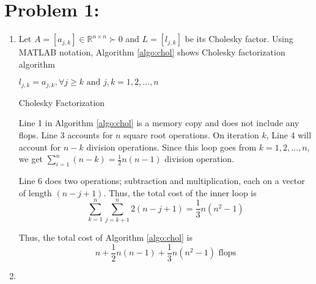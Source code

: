 \section*{Problem 1:}
\begin{enumerate}
\item Let $A = [a_{j,k}] \in \mathbb{R}^{n\times n} \succ 0$ and $L = [l_{j,k}]$ be its Cholesky factor. Using MATLAB notation, Algorithm \ref{algo:chol} shows Cholesky factorization algorithm

\begin{algorithm}[H]
\SetAlgoLined
{}
 $l_{j,k} = a_{j,k}, \forall j\geq k \text{\ and\ }  j,k= 1,2, \ldots, n$ \\
 \caption{Cholesky Factorization}
\label{algo:chol}
\end{algorithm}

\noindent Line 1 in Algorithm \ref{algo:chol} is a memory copy and does not include any flops. Line 3 accounts for $n$ square root operations. On iteration $k$, Line 4 will account for $n-k$ division operations. Since this loop goes from $k= 1,2, \ldots, n $, we get $\sum_{i=1}^{n}(n-k) = \frac{1}{2}n(n-1)$ division operation.

\noindent Line 6 does two operations; subtraction and multiplication, each on a vector of length $(n-j+1)$. Thus, the total cost of the inner loop is 
$$
\sum_{k=1}^{n} \sum_{j=k+1}^{n} 2(n-j+1) = \frac{1}{3}n(n^{2}-1)
$$

Thus, the total cost of Algorithm \ref{algo:chol} is 
$$
n + \frac{1}{2}n(n-1) + \frac{1}{3}n(n^2-1) \text{\ flops}
$$

\item 
 
\end{enumerate}